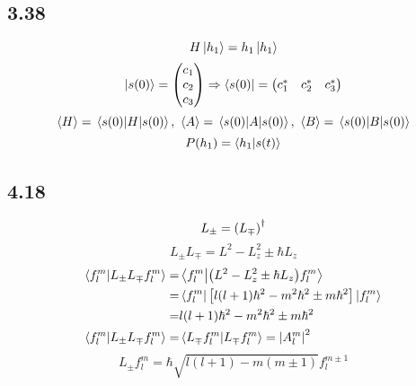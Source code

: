 \subsection{3.38}
\begin{framed}
    \[
    H \ket{h_1} = h_1 \ket{h_1}
    \] \[
    \ket{s(0)} = \mqty(c_1 \\ c_2 \\ c_3) \Rightarrow \bra{s(0)} = \mqty(c_1^* & c_2^* & c_3^*)
    \] \[
    \expval{H} = \ev{H}{s(0)},\ \expval{A} = \ev{A}{s(0)},\ \expval{B} = \ev{B}{s(0)}
    \] \[
    P(h_1) = \braket{h_1}{s(t)}
    \]
\end{framed}

\subsection{4.18}
\begin{framed}
    \[
    L_{\pm} = \qty(L_{\mp})^{\dagger}
    \] \[
    L_{\pm} L_{\mp} = L^2 - L_z^2 \pm \hbar L_z
    \] \begin{align*}
        \braket{f_l^m}{L_{\pm} L_{\mp} f_l^m} = & \braket{f_l^m}{\qty(L^2 - L_z^2 \pm \hbar L_z) f_l^m}\\
        = & \bra{f_l^m} \qty[l(l + 1) \hbar^2 - m^2 \hbar^2 \pm m \hbar^2] \ket{f_l^m}\\
        = & l(l + 1) \hbar^2 - m^2 \hbar^2 \pm m \hbar^2\\
        \braket{f_l^m}{L_{\pm} L_{\mp} f_l^m} = & \braket{L_{\mp} f_l^m}{L_{\mp} f_l^m} = \qty|A_l^m|^2
    \end{align*} \[
    L_{\pm} f_l^m = \hbar \sqrt{l(l + 1) - m(m \pm 1)} f_l^{m \pm 1}
    \]
\end{framed}

